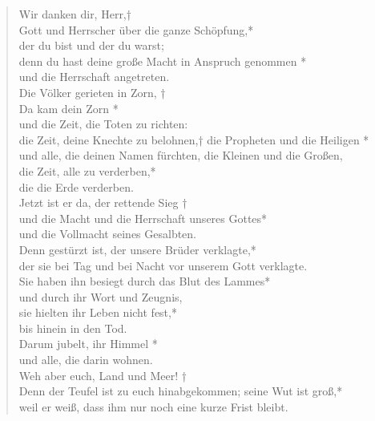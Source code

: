 

\begin{verse}
 Wir danken dir, Herr,†\\
 Gott und Herrscher über die ganze Schöpfung,*\\
 der du bist und der du warst;\\
 \vin denn du hast deine große Macht in Anspruch genommen *\\
 \vin und die Herrschaft angetreten. \\
 Die Völker gerieten in Zorn, †\\
 Da kam dein Zorn *\\
 und die Zeit, die Toten zu richten:\\
 \vin die Zeit, deine Knechte zu belohnen,†
 \vin die Propheten und die Heiligen *\\
 \vin  und alle, die deinen Namen fürchten, die Kleinen und die Großen, \\
  die Zeit, alle zu verderben,*\\
  die die Erde verderben. \\
 
 Jetzt ist er da, der rettende Sieg †\\
und die Macht und die Herrschaft unseres Gottes*\\
und die Vollmacht seines Gesalbten.\\

\vin Denn gestürzt ist, der unsere Brüder verklagte,*\\
\vin der sie bei Tag und bei Nacht vor unserem Gott verklagte.\\
Sie haben ihn besiegt durch das Blut des Lammes*\\
und durch ihr Wort und Zeugnis,\\ 
\vin sie hielten ihr Leben nicht fest,*\\
\vin  bis hinein in den Tod.\\
Darum jubelt, ihr Himmel *\\
und alle, die darin wohnen.\\
\vin Weh aber euch, Land und Meer! †\\
\vin Denn der Teufel ist zu euch hinabgekommen; seine Wut ist groß,*\\
\vin  weil er weiß, dass ihm nur noch eine kurze Frist bleibt.\\

\end{verse}


